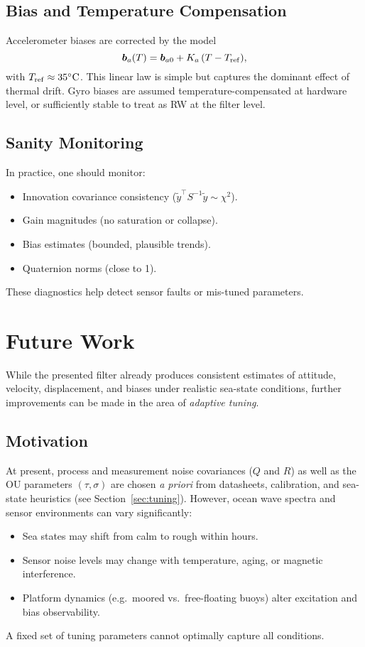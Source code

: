 \documentclass[10pt]{extarticle}
\begin{document}
\subsection{Bias and Temperature Compensation}
Accelerometer biases are corrected by the model
\[
\bm b_a(T) = \bm b_{a0} + K_a\,(T-T_{\rm ref}),
\]
with $T_{\rm ref}\approx 35^\circ{\rm C}$. This linear law is simple but captures the
dominant effect of thermal drift. Gyro biases are assumed temperature-compensated at
hardware level, or sufficiently stable to treat as RW at the filter level.

\subsection{Sanity Monitoring}
In practice, one should monitor:
\begin{itemize}
\item Innovation covariance consistency ($\tilde y^\top S^{-1}\tilde y \sim \chi^2$).
\item Gain magnitudes (no saturation or collapse).
\item Bias estimates (bounded, plausible trends).
\item Quaternion norms (close to 1).
\end{itemize}
These diagnostics help detect sensor faults or mis-tuned parameters.


\section{Future Work}
\label{sec:future-work}

While the presented filter already produces consistent estimates of attitude,
velocity, displacement, and biases under realistic sea-state conditions,
further improvements can be made in the area of \emph{adaptive tuning}.

\subsection{Motivation}
At present, process and measurement noise covariances ($Q$ and $R$) as well as
the OU parameters $(\tau,\sigma)$ are chosen \emph{a priori} from datasheets,
calibration, and sea-state heuristics (see Section~\ref{sec:tuning}).
However, ocean wave spectra and sensor environments can vary significantly:
\begin{itemize}
\item Sea states may shift from calm to rough within hours.
\item Sensor noise levels may change with temperature, aging, or magnetic interference.
\item Platform dynamics (e.g.\ moored vs.\ free-floating buoys) alter excitation and bias observability.
\end{itemize}
A fixed set of tuning parameters cannot optimally capture all conditions.
\end{document}

